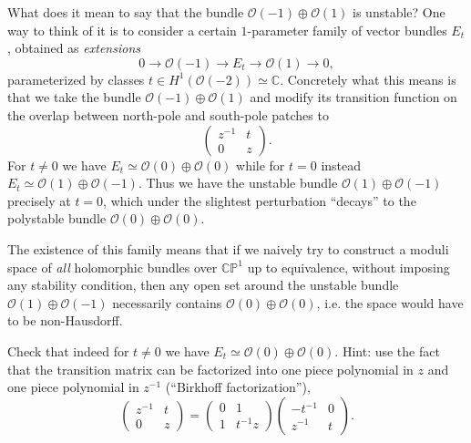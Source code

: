 \documentclass[12pt,letterpaper,reqno]{article}
\numberwithin{equation}{section}
\newcommand{\cO}{\ensuremath{\mathcal O}}
\newcommand{\C}{\ensuremath{\mathbb C}}
\newcommand{\PP}{\ensuremath{\mathbb P}}
\newcommand{\ti}[1]{\textit{#1}}
\begin{document}
\begin{example}[Instability of $\cO(-1) \oplus \cO(1)$]
What does it mean to say that the bundle $\cO(-1) \oplus \cO(1)$
is unstable? One way to think of it is to consider a certain
$1$-parameter family of vector bundles $E_t$, obtained
as \ti{extensions}
\begin{equation}
  0 \to \cO(-1) \to E_t \to \cO(1) \to 0,
\end{equation}
parameterized by classes $t \in H^1(\cO(-2)) \simeq \C$.
Concretely what this means is that we take the bundle
$\cO(-1) \oplus \cO(1)$ and modify its transition function
on the overlap between north-pole and south-pole patches
to
\begin{equation}
  \begin{pmatrix} z^{-1} & t \\ 0 & z \end{pmatrix}.
\end{equation}
For $t \neq 0$ we have $E_t \simeq \cO(0) \oplus \cO(0)$
while for $t = 0$ instead $E_t \simeq \cO(1) \oplus \cO(-1)$.
Thus we have the unstable bundle
$\cO(1) \oplus \cO(-1)$
precisely at $t = 0$, which under the
slightest perturbation ``decays'' to the polystable bundle
$\cO(0) \oplus \cO(0)$.

The existence of this family
means that if we naively try to construct a moduli space of \ti{all} holomorphic bundles
over $\C\PP^1$ up to equivalence, without imposing any stability condition,
then any open set around the unstable
bundle $\cO(1) \oplus \cO(-1)$ necessarily contains $\cO(0) \oplus \cO(0)$,
i.e. the space would have to be non-Hausdorff.
\end{example}

\begin{exercise}
Check that indeed for $t \neq 0$ we have $E_t \simeq \cO(0) \oplus \cO(0)$.
Hint: use the fact that the transition matrix can be factorized into
one piece polynomial in $z$ and one piece polynomial in $z^{-1}$
(``Birkhoff factorization''),
\begin{equation}
   \begin{pmatrix} z^{-1} & t \\ 0 & z \end{pmatrix} = \begin{pmatrix} 0 & 1 \\ 1 & t^{-1}z \end{pmatrix} \begin{pmatrix} -t^{-1} & 0 \\ z^{-1} & t \end{pmatrix}.
\end{equation}
\end{exercise}
\end{document}
